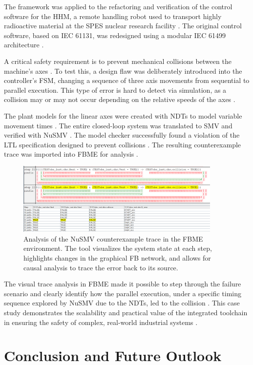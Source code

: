 The framework was applied to the refactoring and verification of the control software for the HHM, a remote handling robot used to transport highly radioactive material at the SPES nuclear research facility . The original control software, based on IEC 61131, was redesigned using a modular IEC 61499 architecture .

A critical safety requirement is to prevent mechanical collisions between the machine's axes . To test this, a design flaw was deliberately introduced into the controller's FSM, changing a sequence of three axis movements from sequential to parallel execution. This type of error is hard to detect via simulation, as a collision may or may not occur depending on the relative speeds of the axes .

The plant models for the linear axes were created with NDTs to model variable movement times . The entire closed-loop system was translated to SMV and verified with NuSMV . The model checker successfully found a violation of the LTL specification designed to prevent collisions . The resulting counterexample trace was imported into FBME for analysis .

\begin{figure}[h]
\centering
\includegraphics[width=0.9\textwidth]{chapters/images/chapter2/vizu_jumeauV1.png}
\caption{Analysis of the NuSMV counterexample trace in the FBME environment. The tool visualizes the system state at each step, highlights changes in the graphical FB network, and allows for causal analysis to trace the error back to its source.}
\label{fig:counterexample_analysis}
\end{figure}

The visual trace analysis in FBME made it possible to step through the failure scenario and clearly identify how the parallel execution, under a specific timing sequence explored by NuSMV due to the NDTs, led to the collision . This case study demonstrates the scalability and practical value of the integrated toolchain in ensuring the safety of complex, real-world industrial systems .

\section{Conclusion and Future Outlook}\label{sec:conclusion}


